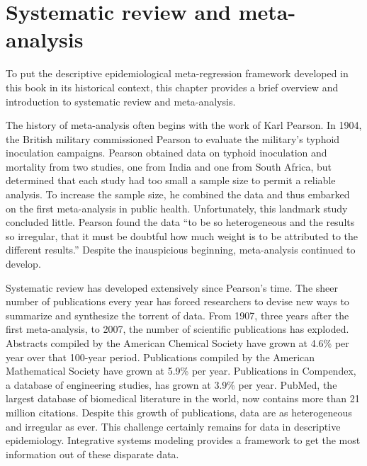 \section{Systematic review and meta-analysis}
To put the descriptive epidemiological
meta-regression framework developed in this book in its historical context, this chapter provides a brief
overview and introduction to systematic review and meta-analysis.

The history of meta-analysis often begins with the work of Karl
Pearson.  In 1904, the British military commissioned Pearson to
evaluate the military's typhoid inoculation
campaigns.\cite{Pearson_Report_1904} Pearson obtained data on typhoid
inoculation and mortality from two studies, one from India and one
from South Africa, but determined that each study had too small a
sample size to permit a reliable analysis. To increase the sample
size, he combined the data and thus embarked on the first
meta-analysis in public health. Unfortunately, this landmark study concluded little. Pearson found the
data ``to be so heterogeneous and the results so irregular, that it
must be doubtful how much weight is to be attributed to the different
results.'' Despite the inauspicious beginning, meta-analysis continued
to develop.


Systematic review has developed extensively since Pearson's time. The
sheer number of publications every year has forced researchers to
devise new ways to summarize and synthesize the torrent of data. From
1907, three years after the first meta-analysis, to 2007, the number of
scientific publications has exploded. Abstracts compiled by the
American Chemical Society have grown at 4.6\% per year over that
100-year period. Publications compiled by the American Mathematical
Society have grown at 5.9\% per year.  Publications in Compendex, a
database of engineering studies, has grown at 3.9\% per year.
\cite{Larsen_Rate_2010} PubMed, the largest database of biomedical
literature in the world, now contains more than 21 million citations.
\cite{us_national_library_of_medicine_national_institutes_of_health_pubmed_2012} Despite this growth of publications, data are 
as heterogeneous and irregular as ever. This challenge certainly remains 
for data in descriptive epidemiology. Integrative systems modeling 
provides a framework to get the most information out of these disparate data.

